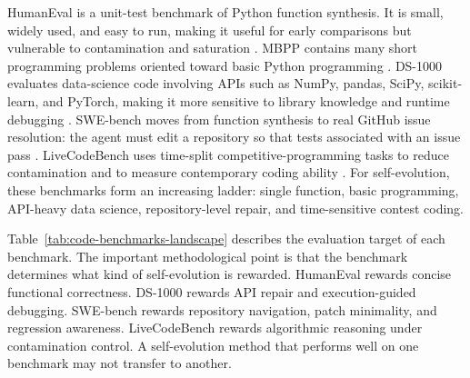 HumanEval is a unit-test benchmark of Python function synthesis. It is small, widely used, and easy to run, making it useful for early comparisons but vulnerable to contamination and saturation \cite{humaneval2021}. MBPP contains many short programming problems oriented toward basic Python programming \cite{mbpp2021}. DS-1000 evaluates data-science code involving APIs such as NumPy, pandas, SciPy, scikit-learn, and PyTorch, making it more sensitive to library knowledge and runtime debugging \cite{ds1000}. SWE-bench moves from function synthesis to real GitHub issue resolution: the agent must edit a repository so that tests associated with an issue pass \cite{swebench2023}. LiveCodeBench uses time-split competitive-programming tasks to reduce contamination and to measure contemporary coding ability \cite{livecodebench2024}. For self-evolution, these benchmarks form an increasing ladder: single function, basic programming, API-heavy data science, repository-level repair, and time-sensitive contest coding.

Table~\ref{tab:code-benchmarks-landscape} describes the evaluation target of each benchmark. The important methodological point is that the benchmark determines what kind of self-evolution is rewarded. HumanEval rewards concise functional correctness. DS-1000 rewards API repair and execution-guided debugging. SWE-bench rewards repository navigation, patch minimality, and regression awareness. LiveCodeBench rewards algorithmic reasoning under contamination control. A self-evolution method that performs well on one benchmark may not transfer to another.

